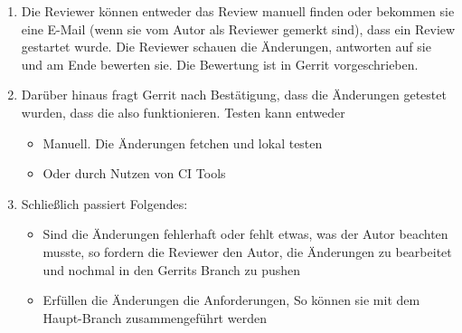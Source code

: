 \begin{itemize}
\begin{enumerate}
			\item Die Reviewer können entweder das Review manuell finden oder bekommen sie eine E-Mail (wenn sie vom Autor als Reviewer gemerkt sind), dass ein Review
				 gestartet wurde. Die Reviewer schauen die Änderungen, antworten auf sie und am Ende bewerten sie. Die Bewertung ist in Gerrit vorgeschrieben.
				 
			\item Darüber hinaus fragt Gerrit nach Bestätigung, dass die Änderungen getestet wurden, dass die also funktionieren. Testen kann entweder 
			\begin{itemize}
				\item Manuell. Die Änderungen fetchen und lokal testen
				\item Oder durch Nutzen von \ac{CI} Tools
			\end{itemize}
			
			\item Schließlich passiert Folgendes:
			\begin{itemize}
				\item Sind die Änderungen fehlerhaft oder fehlt etwas, was der Autor beachten musste, so fordern die Reviewer den Autor, die Änderungen zu bearbeitet
			 		und nochmal in den Gerrits Branch zu pushen
			 	\item Erfüllen die Änderungen die Anforderungen, So können sie mit dem Haupt-Branch zusammengeführt werden
			\end{itemize}			
			
		\end{enumerate}	
\end{itemize}

